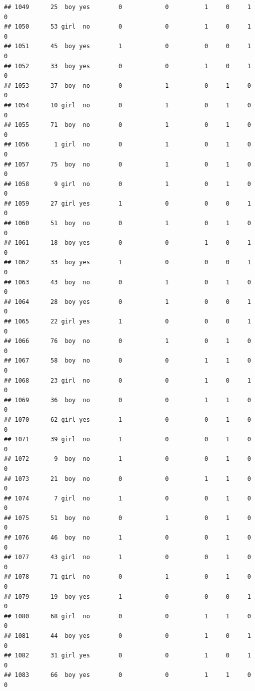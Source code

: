 \documentclass[man]{apa6}
\begin{document}
\begin{verbatim}
## 1049      25  boy yes        0            0          1     0     1     0
## 1050      53 girl  no        0            0          1     0     1     0
## 1051      45  boy yes        1            0          0     0     1     0
## 1052      33  boy yes        0            0          1     0     1     0
## 1053      37  boy  no        0            1          0     1     0     0
## 1054      10 girl  no        0            1          0     1     0     0
## 1055      71  boy  no        0            1          0     1     0     0
## 1056       1 girl  no        0            1          0     1     0     0
## 1057      75  boy  no        0            1          0     1     0     0
## 1058       9 girl  no        0            1          0     1     0     0
## 1059      27 girl yes        1            0          0     0     1     0
## 1060      51  boy  no        0            1          0     1     0     0
## 1061      18  boy yes        0            0          1     0     1     0
## 1062      33  boy yes        1            0          0     0     1     0
## 1063      43  boy  no        0            1          0     1     0     0
## 1064      28  boy yes        0            1          0     0     1     0
## 1065      22 girl yes        1            0          0     0     1     0
## 1066      76  boy  no        0            1          0     1     0     0
## 1067      58  boy  no        0            0          1     1     0     0
## 1068      23 girl  no        0            0          1     0     1     0
## 1069      36  boy  no        0            0          1     1     0     0
## 1070      62 girl yes        1            0          0     1     0     0
## 1071      39 girl  no        1            0          0     1     0     0
## 1072       9  boy  no        1            0          0     1     0     0
## 1073      21  boy  no        0            0          1     1     0     0
## 1074       7 girl  no        1            0          0     1     0     0
## 1075      51  boy  no        0            1          0     1     0     0
## 1076      46  boy  no        1            0          0     1     0     0
## 1077      43 girl  no        1            0          0     1     0     0
## 1078      71 girl  no        0            1          0     1     0     0
## 1079      19  boy yes        1            0          0     0     1     0
## 1080      68 girl  no        0            0          1     1     0     0
## 1081      44  boy yes        0            0          1     0     1     0
## 1082      31 girl yes        0            0          1     0     1     0
## 1083      66  boy yes        0            0          1     1     0     0

\end{verbatim}
\end{document}
